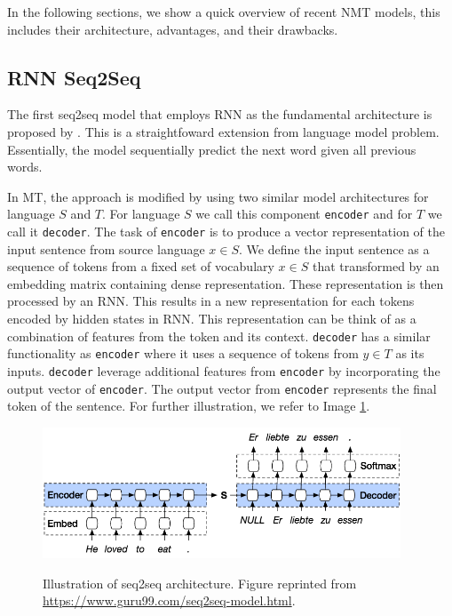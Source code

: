 In the following sections, we show a quick overview of recent NMT models, this includes their architecture, advantages, and their drawbacks.

\subsection{RNN Seq2Seq}
The first seq2seq model that employs RNN as the fundamental architecture is proposed by \cite{sutskever2014sequence}. This is a straightfoward extension from language model problem. Essentially, the model sequentially predict the next word given all previous words.

In MT, the approach is modified by using two similar model architectures for language $S$ and $T$. For language $S$ we call this component \texttt{encoder} and for $T$ we call it \texttt{decoder}.
The task of \texttt{encoder} is to produce a vector representation of the input sentence from source language $x \in S$. We define the input sentence as a sequence of tokens from a fixed set of vocabulary $x \in S$ that transformed by an embedding matrix containing dense representation. These representation is then processed by an RNN. This results in a new representation for each tokens encoded by hidden states in RNN. This representation can be think of as a combination of features from the token and its context.
\texttt{decoder} has a similar functionality as \texttt{encoder} where it uses a sequence of tokens from $y \in T$ as its inputs. \texttt{decoder} leverage additional features from \texttt{encoder} by incorporating the output vector of \texttt{encoder}. The output vector from \texttt{encoder} represents the final token of the sentence. For further illustration, we refer to Image \ref{img:rnnseq2seq}.

\begin{figure}[h]
    {\includegraphics[width=0.95\textwidth]{img/rnnseq2seq.png}}
    \centering
    \caption{Illustration of seq2seq architecture. Figure reprinted from \protect\url{https://www.guru99.com/seq2seq-model.html}.}
    \label{img:rnnseq2seq}
\end{figure}

